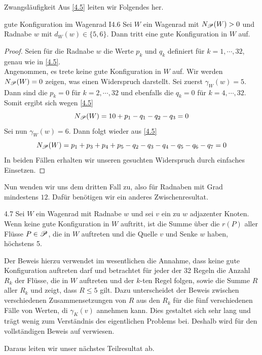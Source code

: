 \begin{section}{Zwangsläufigkeit}
  Aus \ref{4.5} leiten wir Folgendes her.

 \begin{satzl}{gute Konfiguration im Wagenrad I}{4.6}
  Sei $W$ ein Wagenrad mit $N_{\mathscr{P}}(W) > 0$ und Radnabe $w$ mit $d_W(w) \in \{5,6\}$. Dann tritt eine gute Konfiguration in $W$ auf.
 \end{satzl}
 
 \begin{proof}
  Seien für die Radnabe $w$ die Werte $p_k$ und $q_k$ definiert für $k = 1,\cdots,32$, genau wie in \ref{4.5}.\\
  Angenommen, es trete keine gute Konfiguration in $W$ auf. Wir werden $N_{\mathscr{P}}(W) = 0$ zeigen, was einen Widerspruch darstellt. Sei zuerst $\gamma_W(w) = 5$. Dann sind die $p_k = 0$ für $k = 2,\cdots,32$ und ebenfalls die $q_k = 0$ für $k = 4,\cdots,32$. Somit ergibt sich wegen \ref{4.5}
  \[ N_{\mathscr{P}}(W) = 10 + p_1 - q_1 - q_2 - q_3 = 0 \]
  Sei nun $\gamma_W(w) = 6$. Dann folgt wieder aus \ref{4.5}
  \[ N_{\mathscr{P}}(W) = p_1 + p_3 + p_4 + p_5 - q_2 - q_3 - q_4 - q_5 - q_6 - q_7 = 0\]
  In beiden Fällen erhalten wir unseren gesuchten Widerspruch durch einfaches Einsetzen.
 \end{proof}
 
 Nun wenden wir uns dem dritten Fall zu, also für Radnaben  mit Grad mindestens $12$. Dafür benötigen wir ein anderes Zwischenresultat.
 
 \begin{lemmal}{}{4.7}
  Sei $W$ ein Wagenrad mit Radnabe $w$ und sei $v$ ein zu $w$ adjazenter Knoten. Wenn keine gute Konfiguration in $W$ auftritt, ist die Summe über die $r(P)$ aller Flüsse $P \in \mathscr{P}$, die in $W$ auftreten und die Quelle $v$ und Senke $w$ haben, höchstens 5.
 \end{lemmal}

 Der Beweis hierzu verwendet im wesentlichen die Annahme, dass keine gute Konfiguration auftreten darf und betrachtet für jeder der 32 Regeln die Anzahl $R_k$ der Flüsse, die in $W$ auftreten und der $k$-ten Regel folgen, sowie die Summe $R$ aller $R_k$ und zeigt, dass $R \leq 5$ gilt. Dazu unterscheidet der Beweis zwischen verschiedenen Zusammensetzungen von $R$ aus den $R_k$ für die fünf verschiedenen Fälle von Werten, di $\gamma_K(v)$ annehmen kann. Dies gestaltet sich sehr lang und trägt wenig zum Verständnis des eigentlichen Problems bei. Deshalb wird für den vollständigen Beweis auf \cite[Seite 21, Lemma 4.7]{FourRSST} verwiesen.
 
 Daraus leiten wir unser nächstes Teilresultat ab.
 

\end{section}
